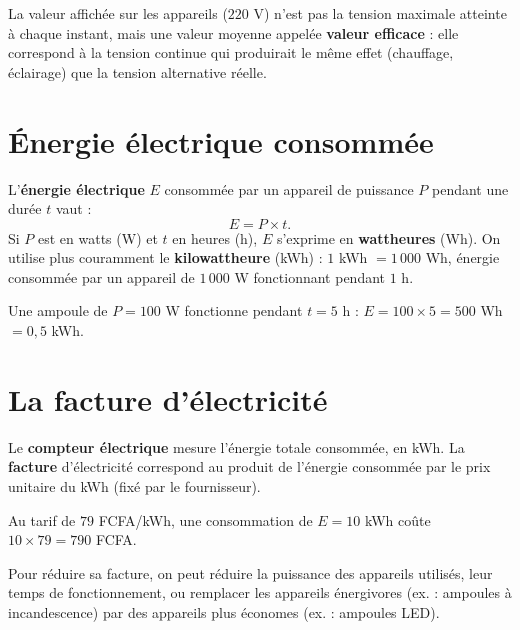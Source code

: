 \begin{remarque}
La valeur affichée sur les appareils ($220$ V) n'est pas la tension maximale atteinte à
chaque instant, mais une valeur moyenne appelée \textbf{valeur efficace} : elle correspond
à la tension continue qui produirait le même effet (chauffage, éclairage) que la tension
alternative réelle.
\end{remarque}

\section{Énergie électrique consommée}

\begin{propriete}
L'\textbf{énergie électrique} $E$ consommée par un appareil de puissance $P$ pendant une
durée $t$ vaut :
\[
E=P\times t.
\]
Si $P$ est en watts (W) et $t$ en heures (h), $E$ s'exprime en \textbf{wattheures} (Wh).
On utilise plus couramment le \textbf{kilowattheure} (kWh) : $1$ kWh $=1\,000$ Wh, énergie
consommée par un appareil de $1\,000$ W fonctionnant pendant $1$ h.
\end{propriete}

\begin{exemple}
Une ampoule de $P=100$ W fonctionne pendant $t=5$ h : $E=100\times5=500$ Wh $=0{,}5$ kWh.
\end{exemple}

\section{La facture d'électricité}

\begin{definition}
Le \textbf{compteur électrique} mesure l'énergie totale consommée, en kWh. La
\textbf{facture} d'électricité correspond au produit de l'énergie consommée par le prix
unitaire du kWh (fixé par le fournisseur).
\end{definition}

\begin{exemple}
Au tarif de $79$ FCFA/kWh, une consommation de $E=10$ kWh coûte
$10\times79=790$ FCFA.
\end{exemple}

\begin{remarque}
Pour réduire sa facture, on peut réduire la puissance des appareils utilisés, leur temps
de fonctionnement, ou remplacer les appareils énergivores (ex. : ampoules à incandescence)
par des appareils plus économes (ex. : ampoules LED).
\end{remarque}

